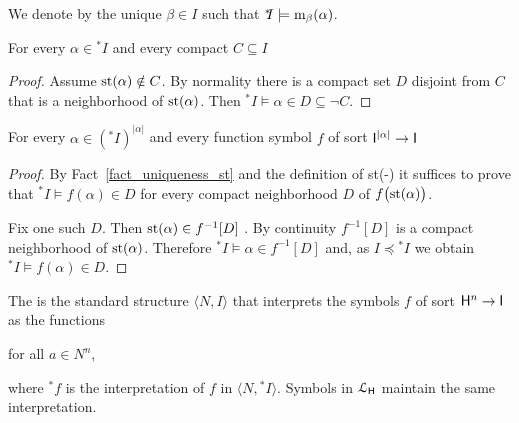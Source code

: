 \documentclass[10pt,oneside]{amsproc}
\renewcommand*{\emph}[1]{%
   \smash{\tikz[baseline]\node[rectangle, fill=teal!25, rounded corners, inner xsep=0.5ex, inner ysep=0.2ex, anchor=base, minimum height = 2.7ex]{\strut #1};}}
\begin{document}
We denote by \emph{${\rm st}(\alpha)$\/} the unique $\beta\in I$ such that ${}^*\!\!I\models{\rm m}_\beta(\alpha)$.

\begin{fact}\label{fact_st1}
  For every $\alpha\in{}^*\! I$ and every compact $C\subseteq I$

\end{fact}

\begin{proof}
  Assume ${\rm st}(\alpha)\notin C$.
  By normality there is a compact set $D$ disjoint from $C$ that is a neighborhood of ${\rm st}(\alpha)$.
  Then  ${}^*\!\!I\models\alpha\in D\subseteq\neg C$.
\end{proof}

\begin{fact}\label{fact_terms_st}
  For every $\alpha\in({}^*\!\!I)^{|\alpha|}$ and every function symbol $f$ of sort ${\sf I}^{|\alpha|}\to{\sf I}$

\end{fact}

\begin{proof}
  By Fact~\ref{fact_uniqueness_st} and the definition of st(-) it suffices to prove that ${}^*\!\!I\models f(\alpha)\in D$ for every compact neighborhood $D$ of $f\big({\rm st}(\alpha)\big)$.
  
  Fix one such $D$.
  Then ${\rm st}(\alpha)\in f^{-1}[D]$ .
  By continuity $f^{-1}[D]$ is a compact neighborhood of ${\rm st}(\alpha)$.
  Therefore ${}^*\!\!I\models \alpha\in f^{-1}[D]$ and, as $I\preceq{}^*\!\!I$ we obtain ${}^*\!\!I\models f(\alpha)\in D$.
\end{proof}

The \emph{standard part of $\langle N,{}^*\!\!I\rangle$\/} is the standard structure $\langle N,I\rangle$ that interprets the symbols $f$ of sort ${\sf H}^n\to {\sf I}$ as the functions

\hfill for all $a\in N^n$,

where ${}^*\!\!f$ is the interpretation of $f$ in  $\langle N,{}^*\!\!I\rangle$.
Symbols in ${\EuScript L}_{\sf H}$ maintain the same interpretation.
\end{document}
